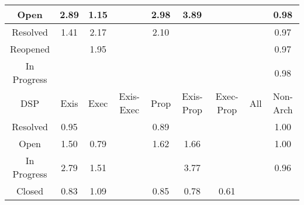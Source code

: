 \begin{tabular}{|c||c|c|c|c|c|c|c|c|}
\hline
Open & \cellcolor[rgb]{0.9005723294440238,0.8355342613155902,0.42} 2.89 & \cellcolor[rgb]{0.9092472020003666,0.8396434114738579,0.42} 1.15 &  & \cellcolor[rgb]{0.9000815965838507,0.8353018089081398,0.42} 2.98 & \cellcolor[rgb]{0.8955729428014637,0.8331661308006933,0.42000000000000004} 3.89 &  &  & \cellcolor[rgb]{0.9070197938395839,0.8258936908406966,0.4172184742502782} 0.98 \\ 
\hline
Resolved & \cellcolor[rgb]{0.9079296400295218,0.8390193031718786,0.42} 1.41 & \cellcolor[rgb]{0.9041750891637566,0.8372408317091479,0.42} 2.17 &  & \cellcolor[rgb]{0.9045117292497548,0.8374002928025153,0.42} 2.10 &  &  &  & \cellcolor[rgb]{0.905105740299498,0.8168338374176234,0.4154320242795314} 0.97 \\ 
\hline
Reopened &  & \cellcolor[rgb]{0.9052394789502584,0.8377450163448592,0.42} 1.95 &  &  &  &  &  & \cellcolor[rgb]{0.9043386609161629,0.8132029950031711,0.414716083521752} 0.97 \\ 
\hline
In Progress &  &  &  &  &  &  &  & \cellcolor[rgb]{0.9066328176694369,0.8240620036353346,0.4168572964914744} 0.98 \\ 
\hline
\hline
DSP & Exis & Exec & Exis-Exec & Prop & Exis-Prop & Exec-Prop & All & Non-Arch \\ 
\hline
Resolved & \cellcolor[rgb]{0.9001068787948884,0.793172559629138,0.4107664202085624} 0.95 &  &  & \cellcolor[rgb]{0.8904398230799667,0.7474151625785088,0.4017438348746355} 0.89 &  &  &  & \cellcolor[rgb]{0.9099919648364391,0.8399961938698922,0.42} 1.00 \\ 
\hline
Open & \cellcolor[rgb]{0.9075057207300201,0.8388184992931673,0.42} 1.50 & \cellcolor[rgb]{0.8718865777674536,0.6595964680992803,0.38442747258295673} 0.79 &  & \cellcolor[rgb]{0.9069047572931959,0.8385338324020402,0.42} 1.62 & \cellcolor[rgb]{0.9066986930172214,0.8384362230081576,0.42} 1.66 &  &  & \cellcolor[rgb]{0.9093535054499751,0.8369399257965482,0.4193966050866433} 1.00 \\ 
\hline
In Progress & \cellcolor[rgb]{0.9010748105341694,0.8357722786740802,0.42} 2.79 & \cellcolor[rgb]{0.9074453126456951,0.8387898849374346,0.42} 1.51 &  &  & \cellcolor[rgb]{0.8961570033136643,0.8334427910433146,0.42} 3.77 &  &  & \cellcolor[rgb]{0.9024170317918022,0.80410728381453,0.412922563005682} 0.96 \\ 
\hline
Closed & \cellcolor[rgb]{0.8780069436968927,0.6885662001652921,0.39013981411709986} 0.83 & \cellcolor[rgb]{0.9095631055269492,0.8397930499864497,0.42} 1.09 &  & \cellcolor[rgb]{0.8816424954055126,0.70577447825276,0.39353299571181183} 0.85 & \cellcolor[rgb]{0.8696275050339854,0.648903523827531,0.3823190046983864} 0.78 & \cellcolor[rgb]{0.8384387515799958,0.5012767574786465,0.3532095014746627} 0.61 &  &  \\ 

\end{tabular}
